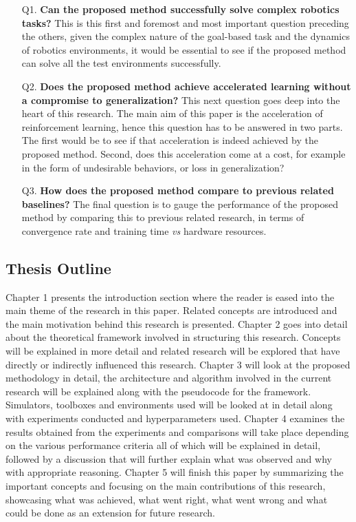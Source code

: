 \begin{itemize}[leftmargin=0.85in]
    \item[Q1.  ] \textbf{Can the proposed method successfully solve complex robotics tasks?} This is this first and foremost and most important question preceding the others, given the complex nature of the goal-based task and the dynamics of robotics environments, it would be essential to see if the proposed method can solve all the test environments successfully. \\

    \item[Q2.  ] \textbf{Does the proposed method achieve accelerated learning without a compromise to generalization?} This next question goes deep into the heart of this research. The main aim of this paper is the acceleration of reinforcement learning, hence this question has to be answered in two parts. The first would be to see if that acceleration is indeed achieved by the proposed method. Second, does this acceleration come at a cost, for example in the form of undesirable behaviors, or loss in generalization? \\

    \item[Q3.  ] \textbf{How does the proposed method compare to previous related baselines?} The final question is to gauge the performance of the proposed method by comparing this to previous related research, in terms of convergence rate and training time \textit{vs} hardware resources. \\
\end{itemize}

\subsection{Thesis Outline}

Chapter 1 presents the introduction section where the reader is eased into the main theme of the research in this paper. Related concepts are introduced and the main motivation behind this research is presented. Chapter 2 goes into detail about the theoretical framework involved in structuring this research. Concepts will be explained in more detail and related research will be explored that have directly or indirectly influenced this research. Chapter 3 will look at the proposed methodology in detail, the architecture and algorithm involved in the current research will be explained along with the pseudocode for the framework. Simulators, toolboxes and environments used will be looked at in detail along with experiments conducted and hyperparameters used. Chapter 4 examines the results obtained from the experiments and comparisons will take place depending on the various performance criteria all of which will be explained in detail, followed by a discussion that will further explain what was observed and why with appropriate reasoning. Chapter 5 will finish this paper by summarizing the important concepts and focusing on the main contributions of this research, showcasing what was achieved, what went right, what went wrong and what could be done as an extension for future research. \\
